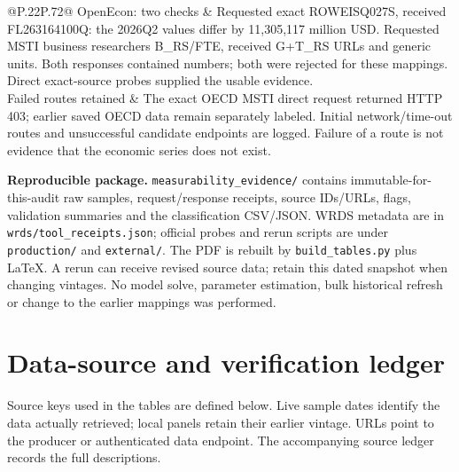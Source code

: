 \documentclass[10pt,a4paper,landscape]{article}
\newcommand{\code}[1]{{\footnotesize\texttt{#1}}}
\begin{document}
\begin{longtable}{@{}P{.22\textwidth}P{.72\textwidth}@{}}
OpenEcon: two checks & Requested exact ROWEISQ027S, received FL263164100Q: the 2026Q2 values differ by 11,305,117 million USD. Requested MSTI business researchers B\_RS/FTE, received G+T\_RS URLs and generic units. Both responses contained numbers; both were rejected for these mappings. Direct exact-source probes supplied the usable evidence.\\[6pt]
Failed routes retained & The exact OECD MSTI direct request returned HTTP 403; earlier saved OECD data remain separately labeled. Initial network/time-out routes and unsuccessful candidate endpoints are logged. Failure of a route is not evidence that the economic series does not exist.\\
\bottomrule
\end{longtable}

\textbf{Reproducible package.} \code{measurability\_evidence/} contains immutable-for-this-audit raw samples, request/response receipts, source IDs/URLs, flags, validation summaries and the classification CSV/JSON. WRDS metadata are in \code{wrds/tool\_receipts.json}; official probes and rerun scripts are under \code{production/} and \code{external/}. The PDF is rebuilt by \code{build\_tables.py} plus LaTeX. A rerun can receive revised source data; retain this dated snapshot when changing vintages. No model solve, parameter estimation, bulk historical refresh or change to the earlier mappings was performed.


\clearpage\section{Data-source and verification ledger}

\small Source keys used in the tables are defined below. Live sample dates identify the data actually retrieved; local panels retain their earlier vintage. URLs point to the producer or authenticated data endpoint. The accompanying source ledger records the full descriptions.
\end{document}
